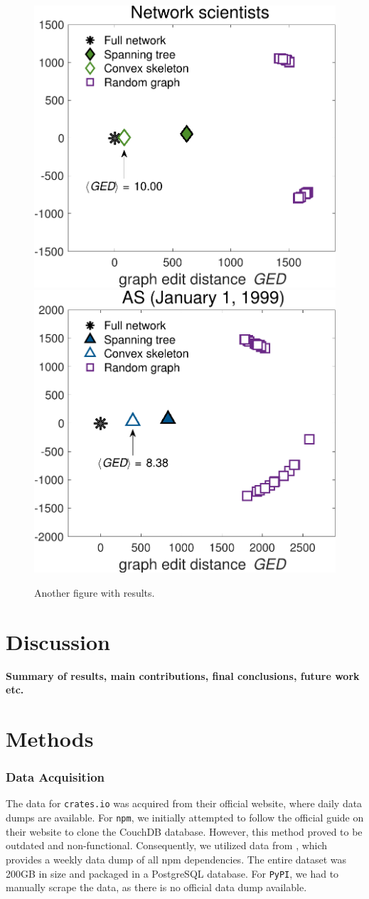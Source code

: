 \documentclass[9pt,twocolumn,twoside]{pnas-report}
\begin{document}
\begin{figure}[t]\centering%
	\includegraphics[width=0.45\linewidth]{results1}\hskip12pt
	\includegraphics[width=0.45\linewidth]{results2}
	\caption{Another figure with results.~\cite{Sub18a}}
	\label{fig:example}
\end{figure}

\section*{Discussion}

 {\bf Summary of results, main contributions, final conclusions, future work etc.}
\lipsum[1-3]

\small

\section*{Methods}


\subsubsection*{Data Acquisition} The data for \texttt{crates.io} was acquired from their official website, where daily data dumps are available.
For \texttt{npm}, we initially attempted to follow the official guide on their website to clone the CouchDB database.
However, this method proved to be outdated and non-functional.
Consequently, we utilized data from \cite{npmdata}, which provides a weekly data dump of all npm dependencies.
The entire dataset was 200GB in size and packaged in a PostgreSQL database.
For \texttt{PyPI}, we had to manually scrape the data, as there is no official data dump available.
\end{document}
